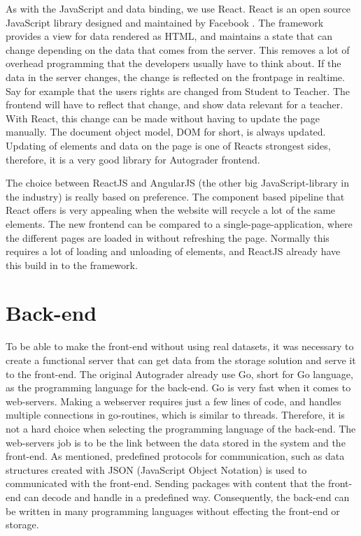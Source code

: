 As with the JavaScript and data binding, we use React. React is an open source JavaScript library designed and maintained by Facebook . The framework provides a view for data rendered as HTML, and maintains a state that can change depending on the data that comes from the server. This removes a lot of overhead programming that the developers usually have to think about. If the data in the server changes, the change is reflected on the frontpage in realtime. Say for example that the users rights are changed from Student to Teacher. The frontend will have to reflect that change, and show data relevant for a teacher. With React, this change can be made without having to update the page manually. The document object model, DOM for short, is always updated. Updating of elements and data on the page is one of Reacts strongest sides, therefore, it is a very good library for Autograder frontend.

The choice between ReactJS and AngularJS (the other big JavaScript-library in the industry) is really based on preference. The component based pipeline that React offers is very appealing when the website will recycle a lot of the same elements. The new frontend can be compared to a single-page-application, where the different pages are loaded in without refreshing the page. Normally this requires a lot of loading and unloading of elements, and ReactJS already have this build in to the framework.

\section{Back-end}
To be able to make the front-end without using real datasets, it was necessary to create a functional server that can get data from the storage solution and serve it to the front-end. The original Autograder already use Go, short for Go language, as the programming language for the back-end. Go is very fast when it comes to web-servers. Making a webserver requires just a few lines of code, and handles multiple connections in go-routines, which is similar to threads. Therefore, it is not a hard choice when selecting the programming language of the back-end. The web-servers job is to be the link between the data stored in the system and the front-end. As mentioned, predefined protocols for communication, such as data structures created with JSON (JavaScript Object Notation) is used to communicated with the front-end. Sending packages with content that the front-end can decode and handle in a predefined way. Consequently, the back-end can be written in many programming languages without effecting the front-end or storage.

